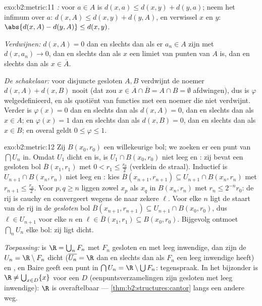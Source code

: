 \begin{solution}{exo:b2:metric:11}
\emph{:} voor $a \in A$ is $d(x, a) \leq d(x, y) + d(y,
a)$; neem het infimum over $a$: $d(x, A) \leq d(x, y) + d(y, A)$,
en verwissel $x$ en $y$: $\abs{d(x,A) - d(y,A)} \leq d(x,y)$.

\emph{Verdwijnen:} $d(x, A) = 0$ dan en slechts dan als er $a_n \in
A$ zijn met $d(x, a_n) \to 0$, dan en slechts dan als $x$ een
limiet van punten van $A$ is, dan en slechts dan als $x \in
\overline A$.

\emph{De schakelaar:} voor disjuncte gesloten $A, B$ verdwijnt de
noemer $d(x,A) + d(x,B)$ nooit (dat zou $x \in \overline A \cap
\overline B = A \cap B = \emptyset$ afdwingen), dus is $\varphi$
welgedefinieerd, en  als quotiënt van  functies met
een noemer die niet verdwijnt. Verder is $\varphi(x) = 0$ dan en
slechts dan als $d(x, A) = 0$, dan en slechts dan als $x \in A$; en
$\varphi(x) = 1$ dan en slechts dan als $d(x, B) = 0$, dan en
slechts dan als $x \in B$; en overal geldt $0 \leq \varphi \leq 1$.
\end{solution}

\begin{solution}{exo:b2:metric:12}
Zij $B(x_0, r_0)$ een willekeurige bol; we zoeken er een punt van
$\bigcap U_n$ in. Omdat $U_1$ dicht en  is, is $U_1 \cap B(x_0,
r_0)$ niet leeg en : zij bevat een gesloten bol $\overline
B(x_1, r_1)$ met $0 < r_1 \leq \frac{r_0}2$ (verklein de straal).
Inductief is $U_{n+1} \cap B(x_n, r_n)$ niet leeg en : kies
$\overline B(x_{n+1}, r_{n+1}) \subseteq U_{n+1} \cap B(x_n, r_n)$
met $r_{n+1} \leq \frac{r_n}2$. Voor $p, q \geq n$ liggen zowel
$x_p$ als $x_q$ in $B(x_n, r_n)$ met $r_n \leq 2^{-n}r_0$: de rij
is cauchy en convergeert wegens de  naar zekere $\ell$.
Voor elke $n$ ligt de staart van de rij in de \emph{gesloten} bol
$\overline B(x_{n+1}, r_{n+1}) \subseteq U_{n+1} \cap B(x_0, r_0)$,
dus $\ell \in U_{n+1}$ voor elke $n$ en $\ell \in \overline B(x_1,
r_1) \subseteq B(x_0, r_0)$. Bijgevolg ontmoet $\bigcap_n U_n$ elke
bol: zij ligt dicht.

\emph{Toepassing:} is $\R = \bigcup_n F_n$ met $F_n$ gesloten en
met leeg inwendige, dan zijn de $U_n = \R \setminus F_n$ dicht
($\overline{U_n} = \R$ dan en slechts dan als $F_n$ een leeg
inwendige heeft) en , en Baire geeft een punt in $\bigcap U_n =
\R \setminus \bigcup F_n$: tegenspraak. In het bijzonder is $\R
\neq \bigcup_{x \in D} \{x\}$ voor een  $D$
(eenpuntsverzamelingen zijn gesloten met leeg inwendige): $\R$ is
overaftelbaar --- \cref{thm:b2:structures:cantor} langs een andere
weg.
\end{solution}

